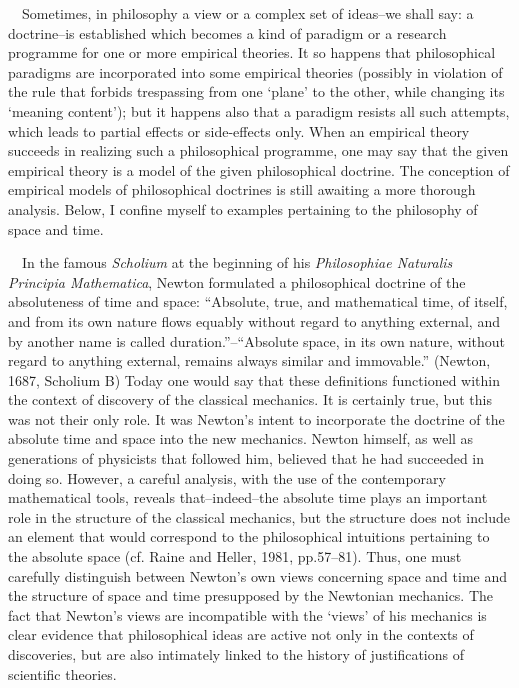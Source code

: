 \documentclass[a4paper]{article}
\begin{document}
\ \ Sometimes, in philosophy a view or a complex set of ideas–we shall say: a doctrine–is established which becomes a
kind of paradigm or a research programme for one or more empirical theories. It so happens that philosophical paradigms
are incorporated into some empirical theories (possibly in violation of the rule that forbids trespassing from one
‘plane’ to the other, while changing its ‘meaning content’); but it happens also that a paradigm resists all such
attempts, which leads to partial effects or side-effects only. When an empirical theory succeeds in realizing such a
philosophical programme, one may say that the given empirical theory is a model of the given philosophical doctrine.
The conception of empirical models of philosophical doctrines is still awaiting a more thorough analysis. Below, I
confine myself to examples pertaining to the philosophy of space and time.

\ \ In the famous \textit{Scholium }at the beginning of his \textit{Philosophiae Naturalis Principia Mathematica},
Newton formulated a philosophical doctrine of the absoluteness of time and space: “Absolute, true, and mathematical
time, of itself, and from its own nature flows equably without regard to anything external, and by another name is
called duration.”–“Absolute space, in its own nature, without regard to anything external, remains always similar and
immovable.” \label{ref:RND5nqR34354w}(Newton, 1687, Scholium B) Today one would say that these definitions functioned
within the context of discovery of the classical mechanics. It is certainly true, but this was not their only role. It
was Newton’s intent to incorporate the doctrine of the absolute time and space into the new mechanics. Newton himself,
as well as generations of physicists that followed him, believed that he had succeeded in doing so. However, a careful
analysis, with the use of the contemporary mathematical tools, reveals that–indeed–the absolute time plays an important
role in the structure of the classical mechanics, but the structure does not include an element that would correspond
to the philosophical intuitions pertaining to the absolute space \label{ref:RND4xun9zJHBa}(cf. Raine and Heller, 1981,
pp.57–81). Thus, one must carefully distinguish between Newton’s own views concerning space and time and the structure
of space and time presupposed by the Newtonian mechanics. The fact that Newton’s views are incompatible with the
‘views’ of his mechanics is clear evidence that philosophical ideas are active not only in the contexts of discoveries,
but are also intimately linked to the history of justifications of scientific theories.
\end{document}
